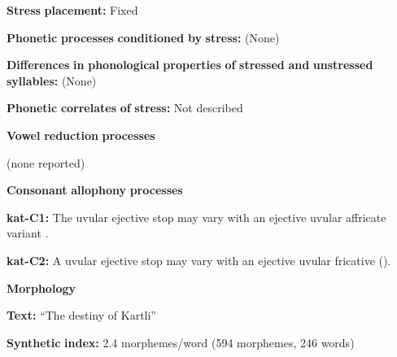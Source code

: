\documentclass[output=paper]{langsci/langscibook}
\begin{document}
\begin{styleBody}
\textbf{Stress} \textbf{placement:} Fixed
\end{styleBody}

\begin{styleBody}
\textbf{Phonetic} \textbf{processes} \textbf{conditioned} \textbf{by} \textbf{stress:} (None)
\end{styleBody}

\begin{styleBody}
\textbf{Differences} \textbf{in} \textbf{phonological} \textbf{properties} \textbf{of} \textbf{stressed} \textbf{and} \textbf{unstressed} \textbf{syllables:} (None)
\end{styleBody}

\begin{styleBody}
\textbf{Phonetic} \textbf{correlates} \textbf{of} \textbf{stress:} Not described
\end{styleBody}

\begin{styleBody}
\textbf{Vowel} \textbf{reduction} \textbf{processes}
\end{styleBody}

\begin{styleBody}
(none reported)
\end{styleBody}

\begin{styleBody}
\textbf{Consonant} \textbf{allophony} \textbf{processes}
\end{styleBody}

\begin{styleBody}
\textbf{kat-C1:} The uvular ejective stop may vary with an ejective uvular affricate variant \citep{Aronson1991}.
\end{styleBody}

\begin{styleBody}
\textbf{kat-C2:} A uvular ejective stop may vary with an ejective uvular fricative (\citealt{ShostedChikovani2006}).
\end{styleBody}

\begin{styleBody}
\textbf{Morphology}
\end{styleBody}

\begin{styleBody}
\textbf{Text:} “The destiny of Kartli” \citep[655-663]{Hewitt1995}
\end{styleBody}

\begin{styleBody}
\textbf{Synthetic} \textbf{index:} 2.4 morphemes/word (594 morphemes, 246 words)
\end{styleBody}
\end{document}
